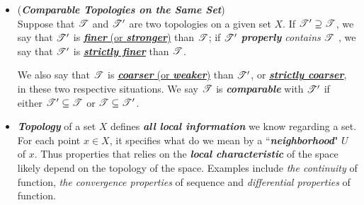 \documentclass[11pt]{article}
\begin{document}
\begin{itemize}
\begin{example}
Both $X$ and $\emptyset$ are in $\srT_{f}$, since $X \setminus X = \emptyset$ is finite and $X \setminus \emptyset$ is all of $X$. If $\{U_{\alpha}\}$ is
an \emph{indexed family of nonempty elements} of $\srT_{f}$, to show that $\cup_{\alpha}U_{\alpha}$ is in $\srT_{c}$, we compute
\begin{align*}
X \setminus \bigcup_{\alpha} U_{\alpha} &= \bigcap_{\alpha} (X \setminus U_{\alpha})
\end{align*}
The latter set is \emph{finite} because each set $X \setminus U_{\alpha}$ is \emph{finite}. If $U_1 \xdotx{,} U_n$ are nonempty elements of $\srT_f$, to show that $\cap_i U_i$ is in $\srT_f$, we compute
\begin{align*}
X - \bigcap_{i=1}^{n} U_i &= \bigcup_{i=1}^{n}(X - U_i)
\end{align*}
The latter set is a \emph{finite union of finite sets} and, therefore, \emph{finite}. \qed
\end{example}

\item \begin{definition} (\emph{\textbf{Comparable Topologies on the Same Set}})\\
Suppose that ${\mathscr T}$ and ${\mathscr T}'$ are two topologies on a given set $X$. If ${\mathscr T}' \supseteq {\mathscr T}$, we say that ${\mathscr T}'$  is \underline{\emph{\textbf{finer}} (or \emph{\textbf{stronger}})} than ${\mathscr T}$; if ${\mathscr T}'$ \emph{\textbf{properly} contains} ${\mathscr T}$ , we say that ${\mathscr T}'$ is \underline{\emph{\textbf{strictly finer}}} than ${\mathscr T}$. 

We also say that ${\mathscr T}$ is \underline{\emph{\textbf{coarser}} (or \emph{\textbf{weaker}})} than ${\mathscr T}'$, or \underline{\emph{\textbf{strictly coarser}}}, in these two respective situations. We say ${\mathscr T}$ is \emph{\textbf{comparable}} with  ${\mathscr T}'$ if either ${\mathscr T}' \subseteq {\mathscr T}$ or ${\mathscr T} \subseteq {\mathscr T}'$.
\end{definition}

\item \begin{remark}
\emph{\textbf{Topology}} of a set $X$ defines \emph{\textbf{all local information}} we know regarding a set. For each point  $x \in X$, it specifies what do we mean by a ``\emph{\textbf{neighborhood}}" $U$ of $x$. Thus properties that relies on the \emph{\textbf{local characteristic}} of the space  likely depend on the topology of the space. Examples include \emph{the continuity} of function, \emph{the convergence properties} of sequence and \emph{differential properties} of function. 
\end{remark}

\end{itemize}
\end{document}
